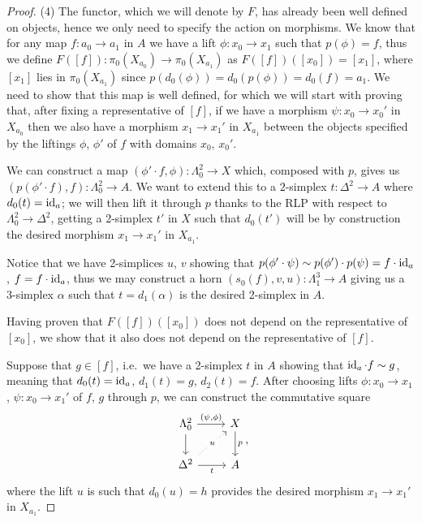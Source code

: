 \documentclass[a4paper,11pt,openany]{scrartcl}
\begin{document}
\begin{proof}
    (4) The functor, which we will denote by $F$, has already been well defined
    on objects, hence we only need to specify the action on morphisms. We know
    that for any map $f\colon a_0\rightarrow a_1$ in $A$ we have a lift
    $\phi\colon x_0\rightarrow x_1$ such that $p(\phi)=f$, thus we define
    $F([f])\colon\pi_0(X_{a_0})\rightarrow\pi_0(X_{a_1})$ as
    $F([f])([x_0])=[x_1]$, where $[x_1]$ lies in $\pi_0(X_{a_1})$ since
    $p(d_0(\phi))=d_0(p(\phi))=d_0(f)=a_1$.
    We need to show that this map is well defined, for which we will start with
    proving that, after fixing a representative of $[f]$, if we have a morphism
    $\psi\colon x_0\rightarrow x_0'$ in
    $X_{a_0}$ then we also have a morphism $x_1\rightarrow x_1'$ in $X_{a_1}$
    between the objects specified by the liftings $\phi$, $\phi'$ of $f$ with
    domains $x_0$, $x_0'$.

    We can construct a map
    $(\phi'\cdot f,\phi)\colon\Lambda^2_0\rightarrow X$ which, composed
    with $p$, gives us $(p(\phi'\cdot f),f)\colon\Lambda^2_0\rightarrow A$. We
    want to extend this to a $2$-simplex $t\colon\Delta^2\rightarrow A$ where
    $d_0(t)=\operatorname{id}_a$; we will then lift it through $p$ thanks to the RLP with
    respect to $\Lambda^2_0\rightarrow\Delta^2$, getting a 2-simplex $t'$ in $X$
    such that $d_0(t')$ will be by construction the desired morphism
    $x_1\rightarrow x_1'$ in $X_{a_1}$.

    Notice that we have 2-simplices $u$, $v$ showing that $p(\phi'\cdot\psi)\sim
    p(\phi')\cdot p(\psi)=f\cdot\operatorname{id}_a$, $f=f\cdot\operatorname{id}_a$, thus we may construct
    a horn $(s_0(f),v,u)\colon\Lambda^3_1\rightarrow A$ giving us a 3-simplex
    $\alpha$ such that $t=d_1(\alpha)$ is the desired 2-simplex in $A$.

    Having proven that $F([f])([x_0])$ does not depend on the representative of
    $[x_0]$, we show that it also does not depend on the representative of
    $[f]$.

    Suppose that $g\in [f]$, i.e.\ we have a 2-simplex $t$ in $A$ showing that
    $\operatorname{id}_a\cdot f\sim g$, meaning that $d_0(t)=\operatorname{id}_a$, $d_1(t)=g$, $d_2(t)=f$.
    After choosing lifts $\phi\colon x_0\rightarrow x_1$, $\psi\colon
    x_0\rightarrow x_1'$ of $f$, $g$ through $p$, we can construct the
    commutative square
    \[\begin{tikzcd}
        {\Lambda^2_0} & X \\
        {\Delta^2} & A
        \arrow["{(\psi,\phi)}", from=1-1, to=1-2]
        \arrow[from=1-1, to=2-1]
        \arrow["t"', from=2-1, to=2-2]
        \arrow["p", from=1-2, to=2-2]
        \arrow["u"{description}, dotted, from=2-1, to=1-2]
    \end{tikzcd},\]
    where the lift $u$ is such that $d_0(u)=h$ provides the desired morphism
    $x_1\rightarrow x_1'$ in $X_{a_1}$.


\end{proof}
\end{document}
